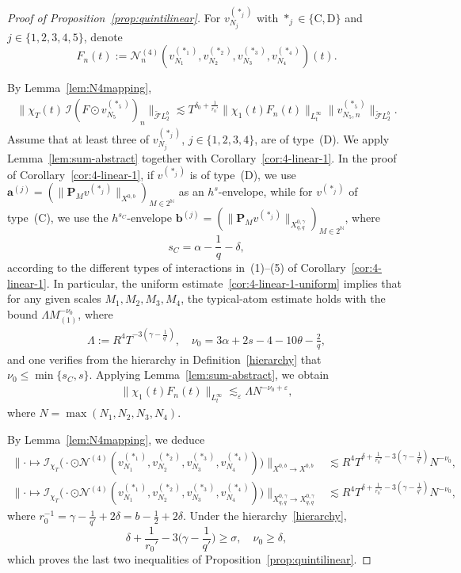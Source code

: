 \documentclass[10pt,a4paper]{amsart}
\newcommand{\N}{\mathbb{N}}
\newcommand{\dotcirc}{\mathbin{\odot}}
\renewcommand{\epsilon}{\varepsilon}
\begin{document}
\begin{proof}[Proof of Proposition~\ref{prop:quintilinear}]

For $v_{N_j}^{(\ast_j)}$ with $\ast_j\in\{\mathrm{C},\mathrm{D}\}$ and $j\in\{1,2,3,4,5\}$, denote
\[
F_n(t):=\mathcal{N}_n^{(4)}(v_{N_1}^{(\ast_1)},v_{N_2}^{(\ast_2)},v_{N_3}^{(\ast_3)},v_{N_4}^{(\ast_4)})(t).
\]

By Lemma~\ref{lem:N4mapping},
\begin{align*}
	\big\|\chi_T(t)\,\mathcal{I}(F\dotcirc v_{N_5}^{(\ast_5)})_n\big\|_{\widetilde{\mathcal{F}}L_2^{b}}\lesssim T^{\delta_0+\frac{1}{r_0'}}\|\chi_1(t)F_n(t)\|_{L_t^{\infty}}\|v_{N_5,n}^{(\ast_5)}\|_{\widetilde{\mathcal{F}}L_2^b}.
\end{align*}
Assume that at least three of $v_{N_j}^{(\ast_j)}$, $j\in\{1,2,3,4\}$, are of type~(D). We apply Lemma~\ref{lem:sum-abstract} together with Corollary~\ref{cor:4-linear-1}.
In the proof of Corollary~\ref{cor:4-linear-1}, if $v^{(\ast_j)}$ is of type~(D), we use $\mathbf{a}^{(j)}=(\|\mathbf{P}_{M}v^{(\ast_j)}\|_{X^{0,b}})_{M\in 2^{\N}}$ as an $h^s$-envelope, while
for $v^{(\ast_j)}$ of type~(C), we use the $h^{s_C}$-envelope $\mathbf{b}^{(j)}=(\|\mathbf{P}_M v^{(\ast_j)}\|_{X_{q,q}^{0,\gamma}})_{M\in 2^{\N}}$, where
\[
s_C=\alpha-\frac{1}{q}-\delta,
\]
according to the different types of interactions in~(1)--(5) of Corollary~\ref{cor:4-linear-1}. In particular, the uniform estimate~\eqref{cor:4-linear-1-uniform} implies that for any given scales $M_1,M_2,M_3,M_4$, the typical-atom estimate holds with the bound $\Lambda M_{(1)}^{-\nu_0}$, where
\begin{align}\label{eq:Lambdanu_0}
	\Lambda:=R^4 T^{-3(\gamma-\frac{1}{q'})},\quad \nu_0=3\alpha+2s-4-10\theta-\frac{2}{q},
\end{align}
and one verifies from the hierarchy in Definition~\ref{hierarchy} that $\nu_0\leq \min\{s_C,s\}$. Applying Lemma~\ref{lem:sum-abstract}, we obtain
\begin{align}\label{bd:finalN_n^4}
	\|\chi_1(t)F_n(t)\|_{L_t^{\infty}}\lesssim_{\epsilon} \Lambda N^{-\nu_0+\epsilon},
\end{align}
where $N=\max(N_1,N_2,N_3,N_4)$.

By Lemma~\ref{lem:N4mapping}, we deduce
\begin{align}
	\big\|\cdot\mapsto
	\mathcal{I}_{\chi_T}\big(
	\cdot\dotcirc\mathcal{N}^{(4)}(v_{N_1}^{(\ast_1)},v_{N_2}^{(\ast_2)},v_{N_3}^{(\ast_3)},v_{N_4}^{(\ast_4)})
	\big)\big\|_{X^{0,b}\to X^{0,b}}
	&\lesssim R^4 T^{\delta+\frac{1}{r_0'}-3(\gamma-\frac{1}{q'})}N^{-\nu_0},\label{opquintic:X0b}\\
	\big\|\cdot\mapsto
	\mathcal{I}_{\chi_T}\big(
	\cdot\dotcirc\mathcal{N}^{(4)}(v_{N_1}^{(\ast_1)},v_{N_2}^{(\ast_2)},v_{N_3}^{(\ast_3)},v_{N_4}^{(\ast_4)})
	\big)\big\|_{X_{q,q}^{0,\gamma}\to X_{q,q}^{0,\gamma}}
	&\lesssim R^4 T^{\delta+\frac{1}{r_0'}-3(\gamma-\frac{1}{q'})}N^{-\nu_0}, \label{opquintic:X0q}
\end{align}
where $r_0^{-1}=\gamma-\frac{1}{q'}+2\delta=b-\frac{1}{2}+2\delta$. Under the hierarchy~\eqref{hierarchy},
\[
\delta+\frac{1}{r_0'}-3\Big(\gamma-\frac{1}{q'}\Big)\geq \sigma,
\quad\nu_0\geq \delta,
\]
which proves the last two inequalities of Proposition~\ref{prop:quintilinear}.


\end{proof}
\end{document}
